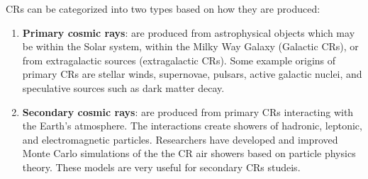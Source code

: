 CRs can be categorized into two types based on
how they are produced:
\begin{enumerate}
    \item \textbf{Primary cosmic rays}:
    are produced from astrophysical objects which may be within the
    Solar system, within the Milky Way Galaxy (Galactic CRs), or
    from extragalactic sources (extragalactic CRs). Some example
    origins of primary CRs are stellar winds, supernovae, pulsars,
    active galactic nuclei, and speculative sources such as dark
    matter decay.
    \item \textbf{Secondary cosmic rays}:
    are produced from primary CRs interacting with the Earth's
    atmosphere. The interactions create showers of hadronic,
    leptonic, and electromagnetic particles. Researchers have
    developed and improved Monte Carlo simulations of the the
    CR air showers based on particle physics theory. These models
    are very useful for secondary CRs studeis.
\end{enumerate}

